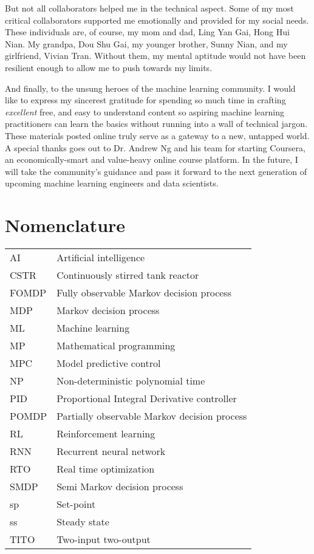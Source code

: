 \documentclass[12pt]{report}
\begin{document}
But not all collaborators helped me in the technical aspect.  Some of my most critical collaborators supported me emotionally and provided for my social needs.  These individuals are, of course, my mom and dad, Ling Yan Gai, Hong Hui Nian.  My grandpa, Dou Shu Gai, my younger brother, Sunny Nian, and my girlfriend, Vivian Tran.  Without them, my mental aptitude would not have been resilient enough to allow me to push towards my limits.

And finally, to the unsung heroes of the machine learning community.  I would like to express my sincerest gratitude for spending so much time in crafting \textit{excellent} free, and easy to understand content so aspiring machine learning practitioners can learn the basics without running into a wall of technical jargon.  These materials posted online truly serve as a gateway to a new, untapped world. A special thanks goes out to Dr. Andrew Ng and his team for starting Coursera, an economically-smart and value-heavy online course platform. In the future, I will take the community's guidance and pass it forward to the next generation of upcoming machine learning engineers and data scientists.

\chapter*{Nomenclature}
\noindent 
\begin{tabular}{@{}ll}
AI & Artificial intelligence \\
CSTR & Continuously stirred tank reactor \\
FOMDP & Fully observable Markov decision process \\
MDP & Markov decision process \\
ML & Machine learning \\
MP & Mathematical programming \\
MPC & Model predictive control \\
NP & Non-deterministic polynomial time \\
PID & Proportional Integral Derivative controller \\
POMDP & Partially observable Markov decision process \\
RL & Reinforcement learning \\
RNN & Recurrent neural network \\
RTO & Real time optimization \\
SMDP & Semi Markov decision process \\
sp & Set-point \\
ss & Steady state \\
TITO & Two-input two-output
\end{tabular}
\end{document}
